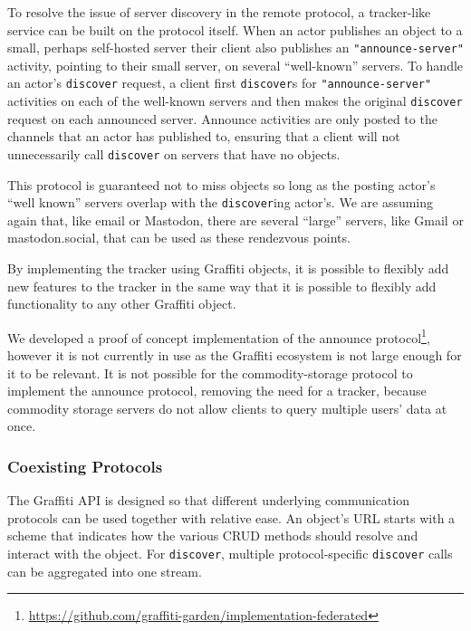 To resolve the issue of server discovery in the remote protocol,
a tracker-like service can be built on the protocol itself.
When an actor publishes an object to a small, perhaps self-hosted
server their client also publishes an \texttt{"announce-server"}
activity, pointing to their small server, on several ``well-known'' servers.
To handle an actor's \texttt{discover} request, a client first \texttt{discover}s
for \texttt{"announce-server"} activities on each of the well-known
servers and then makes the original \texttt{discover} request on each
announced server.
Announce activities are only posted to the channels
that an actor has published to, ensuring that a client
will not unnecessarily call \texttt{discover} on servers
that have no objects.

This protocol is guaranteed not to miss objects so long as
the posting actor's ``well known'' servers overlap with the
\texttt{discover}ing actor's.
We are assuming again that, like email or Mastodon, there are several
``large'' servers, like Gmail or mastodon.social, that can be used as these
rendezvous points.

By implementing the tracker using Graffiti objects,
it is possible to flexibly add new features to the tracker
in the same way that it is possible to flexibly add
functionality to any other Graffiti object.

We developed a proof of concept implementation of the announce protocol\footnote{
    \url{https://github.com/graffiti-garden/implementation-federated}
},
however it is not currently in use as the Graffiti ecosystem is not
large enough for it to be relevant.
It is not possible for the commodity-storage protocol to implement
the announce protocol, removing the need for a tracker,
because commodity storage servers do not allow clients to
query multiple users' data at once.

\subsubsection{Coexisting Protocols}
\label{above-and-below:coexisting-protocols}

The Graffiti API is designed so that different underlying
communication protocols can be used together with relative ease.
An object's URL starts with a scheme that indicates
how the various CRUD methods should resolve and interact with the object.
For \texttt{discover}, multiple protocol-specific \texttt{discover} calls can be
aggregated into one stream.

